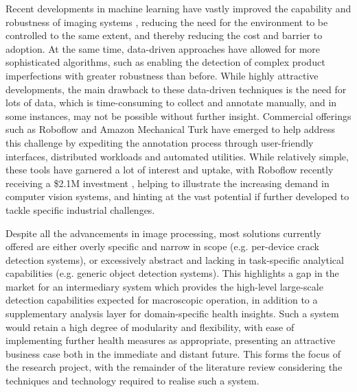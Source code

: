 \documentclass[10pt]{article}
\begin{document}
Recent developments in machine learning have vastly improved the capability and robustness of imaging systems \cite{o2019deep}, reducing the need for the environment to be controlled to the same extent, and thereby reducing the cost and barrier to adoption. At the same time, data-driven approaches have allowed for more sophisticated algorithms, such as enabling the detection of complex product imperfections \cite{lien2018product} with greater robustness than before. While highly attractive developments, the main drawback to these data-driven techniques is the need for lots of data, which is time-consuming to collect and annotate manually, and in some instances, may not be possible without further insight. Commercial offerings such as Roboflow \cite{roboflow} and Amazon Mechanical Turk \cite{mturk} have emerged to help address this challenge by expediting the annotation process through user-friendly interfaces, distributed workloads and automated utilities. While relatively simple, these tools have garnered a lot of interest and uptake, with Roboflow recently receiving a \$2.1M investment \cite{roboflow_news}, helping to illustrate the increasing demand in computer vision systems, and hinting at the vast potential if further developed to tackle specific industrial challenges.

Despite all the advancements in image processing, most solutions currently offered are either overly specific and narrow in scope (e.g. per-device crack detection systems), or excessively abstract and lacking in task-specific analytical capabilities (e.g. generic object detection systems). This highlights a gap in the market for an intermediary system which provides the high-level large-scale detection capabilities expected for macroscopic operation, in addition to a supplementary analysis layer for domain-specific health insights. Such a system would retain a high degree of modularity and flexibility, with ease of implementing further health measures as appropriate, presenting an attractive business case both in the immediate and distant future. This forms the focus of the research project, with the remainder of the literature review considering the techniques and technology required to realise such a system.
\end{document}
